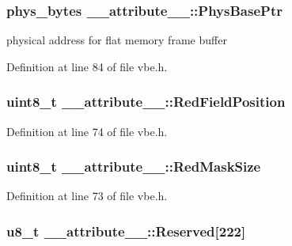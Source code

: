 \subsubsection[{Phys\+Base\+Ptr}]{\setlength{\rightskip}{0pt plus 5cm}phys\+\_\+bytes \+\_\+\+\_\+attribute\+\_\+\+\_\+\+::\+Phys\+Base\+Ptr}\label{struct____attribute_____a852a4f68cfbabf08df197128e137bde6}


physical address for flat memory frame buffer 



Definition at line 84 of file vbe.\+h.

\hypertarget{struct____attribute_____a8b5b2e458757061bce7e056f7f910dae}{}
\subsubsection[{Red\+Field\+Position}]{\setlength{\rightskip}{0pt plus 5cm}uint8\+\_\+t \+\_\+\+\_\+attribute\+\_\+\+\_\+\+::\+Red\+Field\+Position}\label{struct____attribute_____a8b5b2e458757061bce7e056f7f910dae}


Definition at line 74 of file vbe.\+h.

\hypertarget{struct____attribute_____a9ffc14e11d6b1c80b63aba344292849e}{}
\subsubsection[{Red\+Mask\+Size}]{\setlength{\rightskip}{0pt plus 5cm}uint8\+\_\+t \+\_\+\+\_\+attribute\+\_\+\+\_\+\+::\+Red\+Mask\+Size}\label{struct____attribute_____a9ffc14e11d6b1c80b63aba344292849e}


Definition at line 73 of file vbe.\+h.

\hypertarget{struct____attribute_____a7d9d8bf3e618f409748302e3d2484fe6}{}
\subsubsection[{Reserved}]{\setlength{\rightskip}{0pt plus 5cm}u8\+\_\+t \+\_\+\+\_\+attribute\+\_\+\+\_\+\+::\+Reserved\mbox{[}222\mbox{]}}\label{struct____attribute_____a7d9d8bf3e618f409748302e3d2484fe6}


